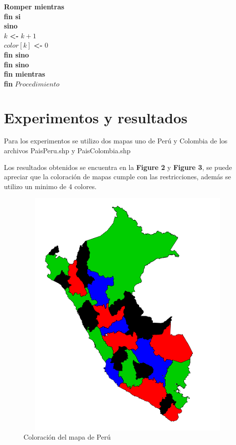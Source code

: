 \documentclass[a4paper]{article}
\begin{document}
\begin{algorithm}
	\hspace{1.6cm} \textbf{Romper mientras}\\
	\hspace{1.1cm} \textbf{fin si}\\
	\hspace{1.1cm} \textbf{sino}\\
	\hspace{1.6cm} $k$ \textbf{<-} $k+1$\\
	\hspace{1.6cm} $color[k]$ \textbf{<-} $0$\\
	\hspace{1.1cm} \textbf{fin sino}\\
	\hspace{0.6cm} \textbf{fin sino}\\
	\hspace{0.1cm} \textbf{fin mientras}\\
	\hspace{0.1cm} \textbf{fin} $Procedimiento$\\	
\end{algorithm}


\pagebreak

\section{Experimentos y resultados}

Para los experimentos se utilizo dos mapas uno de Perú y Colombia de los archivos PaisPeru.shp y PaisColombia.shp

Los resultados obtenidos se encuentra en la \textbf{Figure 2} y \textbf{Figure 3}, se puede apreciar que la coloración de mapas cumple con las restricciones, además se utilizo un minimo de 4 colores.


\begin{figure}
	\centering
	\includegraphics[width=14.5cm,height=12.5cm]{Peru.png}
	\caption{Coloración del mapa de Perú}
	\label{FI1_1}
\end{figure}
\end{document}
